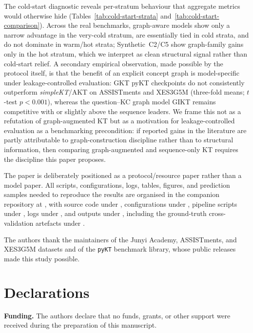 \documentclass[pdflatex,sn-basic]{sn-jnl}
\begin{document}
The cold-start diagnostic reveals per-stratum behaviour that aggregate
metrics would otherwise hide (Tables~\ref{tab:cold-start-strata}
and~\ref{tab:cold-start-comparison}). Across the real benchmarks,
graph-aware models show only a narrow advantage in the very-cold
stratum, are essentially tied in cold strata, and do not dominate in
warm/hot strata; Synthetic~C2/C5 show graph-family gains only in the
hot stratum, which we interpret as clean structural signal rather than
cold-start relief. A secondary empirical observation, made
possible by the protocol itself, is that the benefit of an explicit
concept graph is model-specific under leakage-controlled evaluation: GKT
pyKT checkpoints do not consistently outperform \textit{simpleKT}/AKT on
ASSISTments and XES3G5M (three-fold means; $t$-test $p{<}0.001$), whereas
the question--KC graph model GIKT remains competitive with or slightly
above the sequence leaders. We frame this not as a refutation of
graph-augmented KT but as a motivation for leakage-controlled
evaluation as a benchmarking precondition: if reported gains in the
literature are partly attributable to graph-construction discipline
rather than to structural information, then comparing graph-augmented
and sequence-only KT requires the discipline this paper proposes.

The paper is deliberately positioned as a protocol/resource paper rather
than a model paper. All scripts, configurations, logs, tables, figures,
and prediction samples needed to reproduce the results are organised in
the companion repository at ,
with source code under , configurations under ,
pipeline scripts under , logs under , and
outputs under , including the ground-truth
cross-validation artefacts under .

\backmatter

The authors thank the maintainers of the Junyi Academy, ASSISTments, and
XES3G5M datasets and of the \texttt{pyKT} benchmark library, whose public
releases made this study possible.

\section*{Declarations}

\noindent\textbf{Funding.} The authors declare that no funds, grants, or other
support were received during the preparation of this manuscript.
\end{document}
